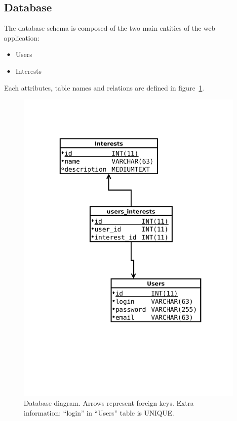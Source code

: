 \documentclass[a4paper,11pt,openany]{report}
\begin{document}
\subsection{Database}
The database schema is composed of the two main entities of the web application:
\begin{itemize}
 \item Users
 \item Interests
\end{itemize}
Each attributes, table names and relations are defined in figure~\ref{figure:database}.

\begin{figure}[h!t]
  \includegraphics[trim=0 200 0 110,clip,height=0.45\textheight]{database.pdf}
  \caption{Database diagram. Arrows represent foreign keys. Extra information: ``login'' in ``Users'' table is UNIQUE.}
  \label{figure:database}
\end{figure}
\end{document}
